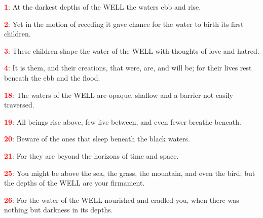 \documentclass[12pt,a4paper,twocolumn]{scrbook}
\newcommand{\wversenum}[1]{\textbf{\textcolor{red}{#1}}}
\newcommand{\wverse}[2]{\wversenum{#1}: #2\par}
\begin{document}

\wverse{1}{At the darkest depths of the WELL the waters ebb and rise.}
\wverse{2}{Yet in the motion of receding it gave chance for the water to birth its first children.}
\wverse{3}{These children shape the water of the WELL with thoughts of love and hatred.}
\wverse{4}{It is them, and their creations, that were, are, and will be; for their lives rest beneath the ebb and the flood.}

\wverse{18}{The waters of the WELL are opaque, shallow and a barrier not easily traversed.}
\wverse{19}{All beings rise above, few live between, and even fewer breathe beneath.}
\wverse{20}{Beware of the ones that sleep beneath the black waters.}
\wverse{21}{For they are beyond the horizons of time and space.}

\wverse{25}{You might be above the sea, the grass, the mountain, and even the bird; but the depths of the WELL are your firmament.}
\wverse{26}{For the water of the WELL nourished and cradled you, when there was nothing but darkness in its depths.}
\end{document}
